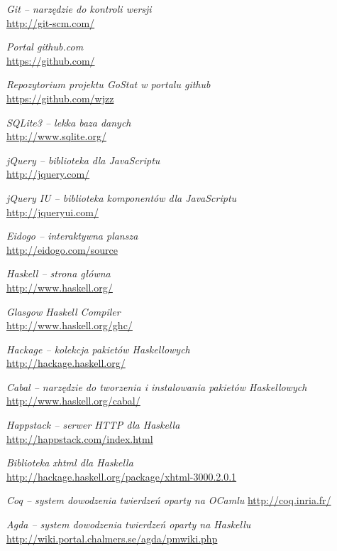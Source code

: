 \documentclass[10pt,leqno]{article}
\begin{document}
\begin{thebibliography}{9}

  \emph{Git -- narzędzie do kontroli wersji} \\
  \url{http://git-scm.com/}

  \emph{Portal github.com} \\
  \url{https://github.com/}

  \emph{Repozytorium projektu GoStat w portalu github} \\
  \url{https://github.com/wjzz}

  \emph{SQLite3 -- lekka baza danych} \\
  \url{http://www.sqlite.org/}

  \emph{jQuery -- biblioteka dla JavaScriptu} \\
  \url{http://jquery.com/}

  \emph{jQuery IU -- biblioteka komponentów dla JavaScriptu} \\
  \url{http://jqueryui.com/}

  \emph{Eidogo -- interaktywna plansza} \\
  \url{http://eidogo.com/source}

  \emph{Haskell -- strona główna} \\
  \url{http://www.haskell.org/}

  \emph{Glasgow Haskell Compiler} \\
  \url{http://www.haskell.org/ghc/}

  \emph{Hackage -- kolekcja pakietów Haskellowych} \\
  \url{http://hackage.haskell.org/}

  \emph{Cabal -- narzędzie do tworzenia i instalowania pakietów Haskellowych} \\
  \url{http://www.haskell.org/cabal/}

  \emph{Happstack -- serwer HTTP dla Haskella} \\
  \url{http://happstack.com/index.html}

  \emph{Biblioteka xhtml dla Haskella} \\
  \url{http://hackage.haskell.org/package/xhtml-3000.2.0.1}

  \emph{Coq -- system dowodzenia twierdzeń oparty na OCamlu}
  \url{http://coq.inria.fr/}

  \emph{Agda -- system dowodzenia twierdzeń oparty na Haskellu}
  \url{http://wiki.portal.chalmers.se/agda/pmwiki.php}

\end{thebibliography}
\end{document}
